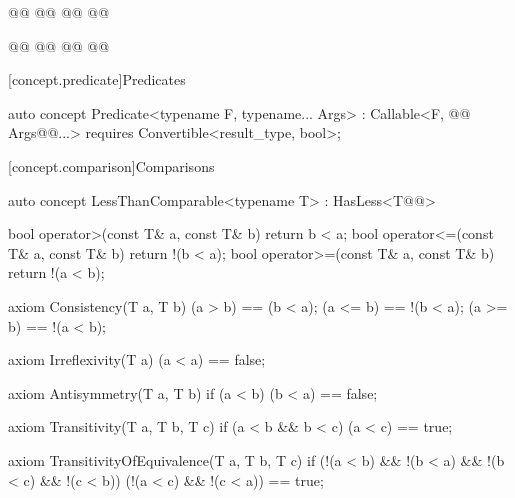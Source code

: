 \documentclass[american,twoside]{book}
\begin{document}
\begin{itemdecl}
@@
  @@
  @@
@\addedCC{\}}@
\end{itemdecl}

\begin{itemdescr}
\pnum
{}
\end{itemdescr}

\begin{itemdecl}
@@
  @@
  @@
@\addedCC{\}}@
\end{itemdecl}

\begin{itemdescr}
\pnum
{}
\end{itemdescr}

[concept.predicate]{Predicates}

\begin{itemdecl}
auto concept Predicate<typename F, typename... Args> : Callable<F, @@ Args@\addedCC{\&}@...> {
  requires Convertible<result_type, bool>;
}
\end{itemdecl}

\begin{itemdescr}
\pnum
{}

\pnum
{}
\end{itemdescr}

[concept.comparison]{Comparisons}
\begin{itemdecl}
auto concept LessThanComparable<typename T> : HasLess<T@@> {
  bool operator>(const T& a, const T& b) { return b < a; }
  bool operator<=(const T& a, const T& b) { return !(b < a); }
  bool operator>=(const T& a, const T& b) { return !(a < b); }

  axiom Consistency(T a, T b) {
    (a > b) == (b < a);
    (a <= b) == !(b < a);
    (a >= b) == !(a < b);
  }

  axiom Irreflexivity(T a) { (a < a) == false; }

  axiom Antisymmetry(T a, T b) { 
    if (a < b) 
      (b < a) == false;
  }

  axiom Transitivity(T a, T b, T c) {
    if (a < b && b < c) 
      (a < c) == true;
  }

  axiom TransitivityOfEquivalence(T a, T b, T c) {
    if (!(a < b) && !(b < a) && !(b < c) && !(c < b))
      (!(a < c) && !(c < a)) == true;
  } 
}
\end{itemdecl}
\end{document}
